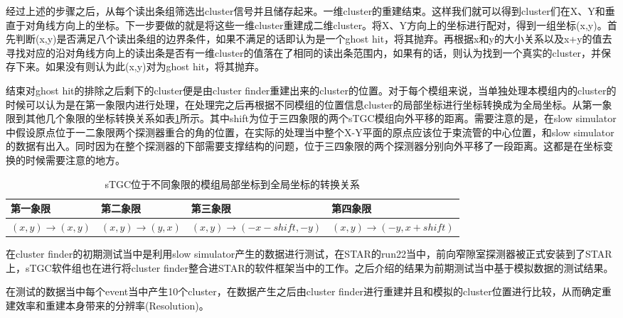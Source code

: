 经过上述的步骤之后，从每个读出条组筛选出cluster信号并且储存起来。一维cluster的重建结束。这样我们就可以得到cluster们在X、Y和垂直于对角线方向上的坐标。下一步要做的就是将这些一维cluster重建成二维cluster。将X、Y方向上的坐标进行配对，得到一组坐标(x,y)。首先判断(x,y)是否满足八个读出条组的边界条件，如果不满足的话即认为是一个ghost hit，将其抛弃。再根据x和y的大小关系以及x+y的值去寻找对应的沿对角线方向上的读出条是否有一维cluster的值落在了相同的读出条范围内，如果有的话，则认为找到一个真实的cluster，并保存下来。如果没有则认为此(x,y)对为ghost hit，将其抛弃。

结束对ghost hit的排除之后剩下的cluster便是由cluster finder重建出来的cluster的位置。对于每个模组来说，当单独处理本模组内的cluster的时候可以认为是在第一象限内进行处理，在处理完之后再根据不同模组的位置信息cluster的局部坐标进行坐标转换成为全局坐标。从第一象限到其他几个象限的坐标转换关系如表\ref{tab:Coordinate_conversion}所示。其中shift为位于三四象限的两个sTGC模组向外平移的距离。需要注意的是，在slow simulator中假设原点位于一二象限两个探测器重合的角的位置，在实际的处理当中整个X-Y平面的原点应该位于束流管的中心位置，和slow simulator的数据有出入。同时因为在整个探测器的下部需要支撑结构的问题，位于三四象限的两个探测器分别向外平移了一段距离。这都是在坐标变换的时候需要注意的地方。

\begin{table}[h!]
    \centering
    \caption{sTGC位于不同象限的模组局部坐标到全局坐标的转换关系}
    \label{tab:Coordinate_conversion}
    \begin{tabularx}{0.9\textwidth} {| >{\centering\arraybackslash}X |>{\centering\arraybackslash}X |>{\centering\arraybackslash}X |>{\centering\arraybackslash}X |}
        \hline
        第一象限 & 第二象限 &  第三象限 &  第四象限\\
        \hline
        $(x,y) \rightarrow (x,y)$& $(x,y) \rightarrow (y,x)$ & $(x,y) \rightarrow (-x-shift,-y)$ & $(x,y) \rightarrow (-y,x+shift)$\\
        \hline
    \end{tabularx}
\end{table}

在cluster finder的初期测试当中是利用slow simulator产生的数据进行测试，在STAR的run22当中，前向窄隙室探测器被正式安装到了STAR上，sTGC软件组也在进行将cluster finder整合进STAR的软件框架当中的工作。之后介绍的结果为前期测试当中基于模拟数据的测试结果。

在测试的数据当中每个event当中产生10个cluster，在数据产生之后由cluster finder进行重建并且和模拟的cluster位置进行比较，从而确定重建效率和重建本身带来的分辨率(Resolution)。

